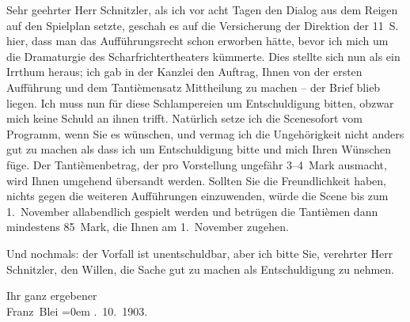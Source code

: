 \pstart{}Sehr geehrter Herr Schnitzler,\pend\vspace{0.5em}
\pstart
           als ich vor acht Tagen den Dialog aus dem Reigen
               auf den Spielplan setzte, geschah es auf die Versicherung der Direktion der 11 S. hier, dass man das Aufführungsrecht schon
               erworben hätte, bevor ich mich um die Dramaturgie des Scharfrichtertheaters kümmerte. Dies stellte sich nun als ein Irrthum
               heraus; ich gab in der Kanzlei den Auftrag, Ihnen von der ersten Aufführung und dem
               Tantièmensatz Mittheilung zu machen – der Brief blieb liegen. Ich muss nun für diese
               Schlampereien um Entschuldigung bitten, obzwar mich keine Schuld an ihnen trifft.
               Natürlich setze ich die Scenesofort vom Programm, wenn Sie es wünschen, und
               vermag ich die Ungehörigkeit {\pb}nicht anders gut zu machen als
               dass ich um Entschuldigung bitte und mich Ihren Wünschen füge. Der Tantièmenbetrag,
               der pro Vorstellung ungefähr 3–4 Mark ausmacht, wird Ihnen umgehend übersandt werden.
               Sollten Sie die Freundlichkeit \introOben{}haben\introOben{}, nichts gegen die
               weiteren Aufführungen einzuwenden, würde die Scene bis zum 1. November allabendlich
               gespielt werden und betrügen die Tantièmen dann mindestens 85 Mark, die Ihnen am
                  1. November zugehen.\pend
           
\pstart
           Und nochmals: der Vorfall ist unentschuldbar, aber ich bitte Sie, verehrter Herr
               Schnitzler, den Willen, die Sache gut zu machen als Entschuldigung zu nehmen.\pend
           
\pstart
           Ihr ganz ergebener{\\[\baselineskip]}\spacefill\mbox{Franz Blei}\pend
           \leftskip=0em{}
. 10. 1903.\pend
           
